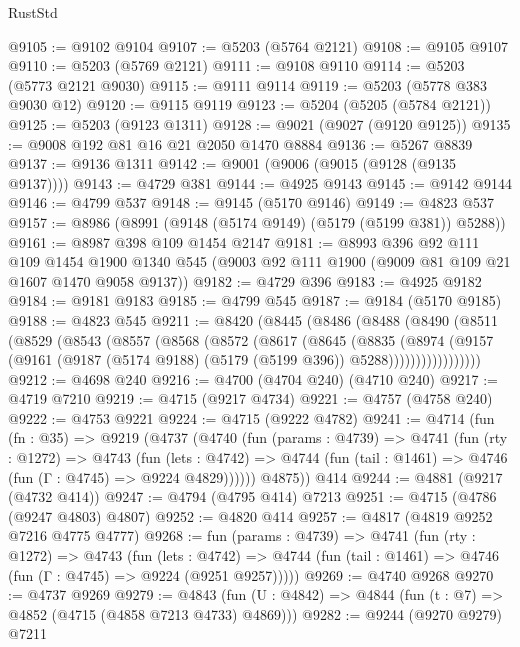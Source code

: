 \begin{lexlean}{RustStd}
\begin{coremodule}
@9105 := @9102 @9104
@9107 := @5203 (@5764 @2121)
@9108 := @9105 @9107
@9110 := @5203 (@5769 @2121)
@9111 := @9108 @9110
@9114 := @5203 (@5773 @2121 @9030)
@9115 := @9111 @9114
@9119 := @5203 (@5778 @383 @9030 @12)
@9120 := @9115 @9119
@9123 := @5204 (@5205 (@5784 @2121))
@9125 := @5203 (@9123 @1311)
@9128 := @9021 (@9027 (@9120 @9125))
@9135 := @9008 @192 @81 @16 @21 @2050 @1470 @8884
@9136 := @5267 @8839
@9137 := @9136 @1311
@9142 := @9001 (@9006 (@9015 (@9128 (@9135 @9137))))
@9143 := @4729 @381
@9144 := @4925 @9143
@9145 := @9142 @9144
@9146 := @4799 @537
@9148 := @9145 (@5170 @9146)
@9149 := @4823 @537
@9157 := @8986 (@8991 (@9148 (@5174 @9149) (@5179 (@5199 @381)) @5288))
@9161 := @8987 @398 @109 @1454 @2147
@9181 := @8993
    @396
    @92
    @111
    @109
    @1454
    @1900
    @1340
    @545
    (@9003 @92 @111 @1900 (@9009 @81 @109 @21 @1607 @1470 @9058 @9137))
@9182 := @4729 @396
@9183 := @4925 @9182
@9184 := @9181 @9183
@9185 := @4799 @545
@9187 := @9184 (@5170 @9185)
@9188 := @4823 @545
@9211 := @8420
    (@8445
      (@8486
        (@8488
          (@8490
            (@8511
              (@8529
                (@8543
                  (@8557
                    (@8568
                      (@8572
                        (@8617
                          (@8645
                            (@8835
                              (@8974
                                (@9157
                                  (@9161
                                    (@9187 (@5174 @9188) (@5179 (@5199 @396)) @5288)))))))))))))))))
@9212 := @4698 @240
@9216 := @4700 (@4704 @240) (@4710 @240)
@9217 := @4719 @7210
@9219 := @4715 (@9217 @4734)
@9221 := @4757 (@4758 @240)
@9222 := @4753 @9221
@9224 := @4715 (@9222 @4782)
@9241 := @4714
    (fun (fn : @35) =>
    @9219
      (@4737
        (@4740
          (fun (params : @4739) =>
          @4741
            (fun (rty : @1272) =>
            @4743
              (fun (lets : @4742) =>
              @4744 (fun (tail : @1461) => @4746 (fun (Γ : @4745) => @9224 @4829))))))
        @4875))
    @414
@9244 := @4881 (@9217 (@4732 @414))
@9247 := @4794 (@4795 @414) @7213
@9251 := @4715 (@4786 (@9247 @4803) @4807)
@9252 := @4820 @414
@9257 := @4817 (@4819 @9252 @7216 @4775 @4777)
@9268 := fun (params : @4739) =>
  @4741
    (fun (rty : @1272) =>
    @4743
      (fun (lets : @4742) =>
      @4744 (fun (tail : @1461) => @4746 (fun (Γ : @4745) => @9224 (@9251 @9257)))))
@9269 := @4740 @9268
@9270 := @4737 @9269
@9279 := @4843 (fun (U : @4842) => @4844 (fun (t : @7) => @4852 (@4715 (@4858 @7213 @4733) @4869)))
@9282 := @9244 (@9270 @9279) @7211

\end{coremodule}
\end{lexlean}
